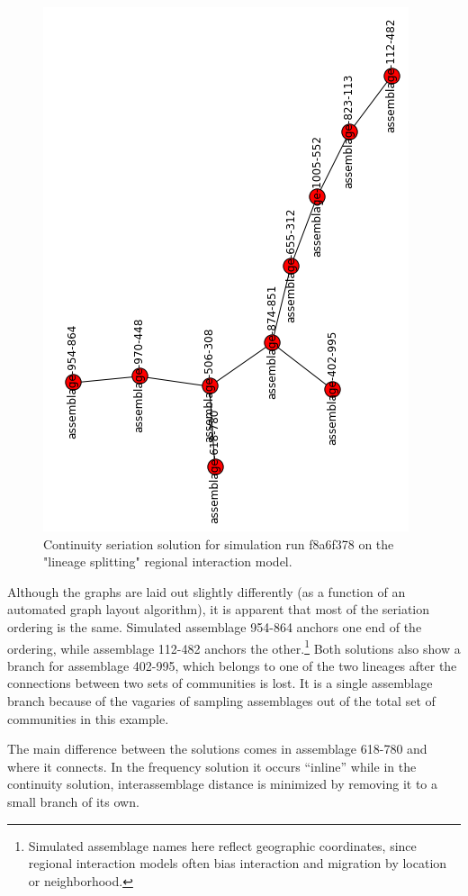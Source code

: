 \begin{figure}[ht]
\centering
\includegraphics[scale=0.4,angle=270]{graphics/multipleseriation/f8a6f378-cont.png}
\caption{Continuity seriation solution for simulation run f8a6f378 on the "lineage splitting" regional interaction model.}
\label{multser:img:differing-cont}
\end{figure}

Although the graphs are laid out slightly differently (as a function of
an automated graph layout algorithm), it is apparent that most of the
seriation ordering is the same. Simulated assemblage 954-864 anchors one
end of the ordering, while assemblage 112-482 anchors the
other.\footnote{Simulated assemblage names here reflect geographic
  coordinates, since regional interaction models often bias interaction
  and migration by location or neighborhood.} Both solutions also show a
branch for assemblage 402-995, which belongs to one of the two lineages
after the connections between two sets of communities is lost. It is a
single assemblage branch because of the vagaries of sampling assemblages
out of the total set of communities in this example. 

The main difference between the solutions comes in assemblage 618-780 and where it connects.
In the frequency solution it occurs ``inline'' while in the continuity
solution, interassemblage distance is minimized by removing it to a
small branch of its own.

